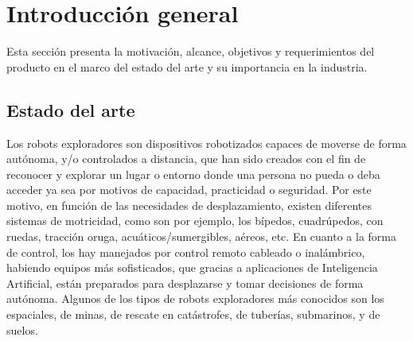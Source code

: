
\chapter{Introducción general} %

\label{Chapter1} %
\label{IntroGeneral}

Esta sección presenta la motivación, alcance, objetivos y requerimientos del producto en el marco del estado del arte y su importancia en la industria.


\newcommand{\keyword}[1]{\textbf{#1}}
\newcommand{\tabhead}[1]{\textbf{#1}}
\newcommand{\code}[1]{\texttt{#1}}
\newcommand{\file}[1]{\texttt{\bfseries#1}}
\newcommand{\option}[1]{\texttt{\itshape#1}}
\newcommand{\grados}{$^{\circ}$}



\section{Estado del arte}


Los robots exploradores son dispositivos robotizados capaces de moverse de forma autónoma, y/o controlados a distancia, que han sido creados con el fin de reconocer y explorar un lugar o entorno donde una persona no pueda o deba acceder ya sea por motivos de capacidad, practicidad o seguridad. Por este motivo, en función de las necesidades de desplazamiento, existen diferentes sistemas de motricidad, como son por ejemplo, los bípedos, cuadrúpedos, con ruedas, tracción oruga, acuáticos/sumergibles, aéreos, etc. En cuanto a la forma de control, los hay manejados por control remoto cableado o inalámbrico, habiendo equipos más sofisticados, que gracias a aplicaciones de Inteligencia Artificial, están preparados para desplazarse y tomar decisiones de forma autónoma. Algunos de los tipos de robots exploradores más conocidos son los espaciales, de minas, de rescate en catástrofes, de tuberías, submarinos, y de suelos.

